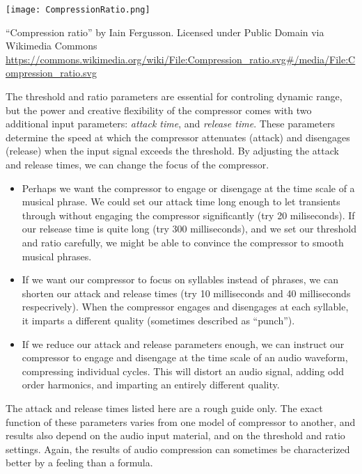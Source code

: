 \begin{marginfigure}
  \texttt{[image: CompressionRatio.png]}
  \caption{``Compression ratio'' by Iain Fergusson. Licensed under
     Public Domain via Wikimedia Commons 
     \url{https://commons.wikimedia.org/wiki/File:Compression_ratio.svg\#/media/File:Compression_ratio.svg}
   }
  \label{fig:comp-ratio}
\end{marginfigure}

The threshold and ratio parameters are essential for controling dynamic
range, but the power and creative flexibility of the compressor comes
with two additional input parameters: \textit{attack time}, and
\textit{release time}. These parameters determine the speed at which
the compressor attenuates (attack) and disengages (release) when the
input signal exceeds the threshold. By adjusting the attack and
release times, we can change the focus of the compressor.
\begin{itemize}
\item Perhaps we want the compressor to engage or disengage at the
  time scale of a musical phrase. We could set our attack time long
  enough to let transients through without engaging the compressor
  significantly (try 20 miliseconds). If our relsease time is quite
  long (try 300 milliseconds), and we set our threshold and ratio
  carefully, we might be able to convince the compressor to smooth
  musical phrases.
\item If we want our compressor to focus on syllables instead of
  phrases, we can shorten our attack and release times (try 10
  milliseconds and 40 milliseconds respecrively). When the compressor
  engages and disengages at each syllable, it imparts a different
  quality (sometimes described as ``punch'').
\item If we reduce our attack and release parameters enough, we can
  instruct our compressor to engage and disengage at the time scale of
  an audio waveform, compressing individual cycles. This will distort
  an audio signal, adding odd order harmonics, and
imparting an entirely different quality.
\end{itemize}
The attack and release times listed here are a rough guide only.  The
exact function of these parameters varies from one model of compressor
to another, and results also depend on the audio input material, and
on the threshold and ratio settings. Again, the results of audio
compression can sometimes be characterized better by a feeling than a
formula.

